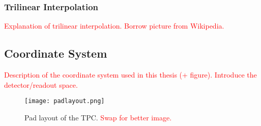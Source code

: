 			\subsubsection{Trilinear Interpolation}
			\textcolor{red}{Explanation of trilinear interpolation. Borrow picture from Wikipedia.}
		
		\subsection{Coordinate System}
		\label{sec:coor}
		\textcolor{red}{Description of the coordinate system used in this thesis (+ figure). Introduce the detector/readout space.}
	
	\begin{figure}
		\centering
		\texttt{[image: padlayout.png]}
		\caption{Pad layout of the TPC. \textcolor{red}{Swap for better image.}}
		\label{fig:padlayout}
	\end{figure}